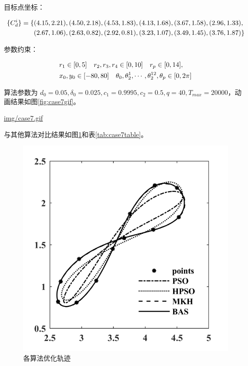 \documentclass[]{ctexbook}
\begin{document}
目标点坐标：

\begin{align}
\{C_d^i\} = \{&(4.15,2.21),(4.50,2.18),(4.53,1.83),(4.13,1.68),(3.67,1.58),(2.96,1.33), \notag \\
&(2.67,1.06),(2.63,0.82),(2.92,0.81),(3.23,1.07),(3.49,1.45),(3.76,1.87)\}\notag\\
\end{align}

参数约束：

\begin{align}
&r_1\in[0,5]\quad r_2,r_3,r_4\in[0,10] \quad r_p\in[0,14],\notag \\
&x_0,y_0\in[-80,80]\quad \theta_0,\theta_2^1,\cdots,\theta_2^{12},\theta_p\in[0,2\pi] \notag \\
\end{align}

算法参数为
\(d_0 = 0.05,\delta_0=0.025,c_1=0.9995,c_2=0.5,q=40,T_{max}=20000\)，动画结果如图\ref{fig:case7gif}。

\url{img/case7.gif}

与其他算法对比结果如图\ref{fig:case7png}和表\ref{tab:case7table}。

\begin{figure}

{\centering \includegraphics[width=0.5\linewidth]{img/case7png} 

}

\caption{各算法优化轨迹}\label{fig:case7png}
\end{figure}
\end{document}
